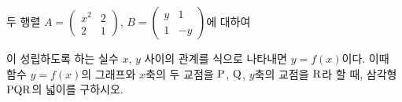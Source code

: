 두 행렬 $A=\begin{pmatrix} x^2 & 2 \\ 2 & 1 \end{pmatrix}$, $B=\begin{pmatrix} y & 1 \\ 1 & -y \end{pmatrix}$에 대하여\par\smallskip{}\par\smallskip\noindent 이 성립하도록 하는 실수 $x$, $y$ 사이의 관계를 식으로 나타내면 $y=f(x)$이다. 이때 함수 $y=f(x)$의 그래프와 $x$축의 두 교점을 $\mathrm{P}$, $\mathrm{Q}$, $y$축의 교점을 $\mathrm{R}$라 할 때, 삼각형~$\mathrm{PQR}$의 넓이를 구하시오.
